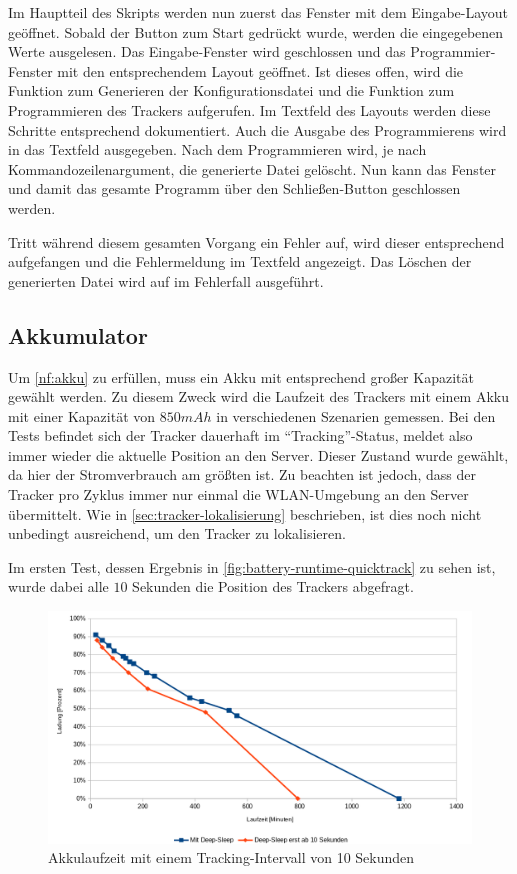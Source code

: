 Im Hauptteil des Skripts werden nun zuerst das Fenster mit dem Eingabe-Layout geöffnet.
Sobald der Button zum Start gedrückt wurde, werden die eingegebenen Werte ausgelesen.
Das Eingabe-Fenster wird geschlossen und das Programmier-Fenster mit den entsprechendem Layout geöffnet.
Ist dieses offen, wird die Funktion zum Generieren der Konfigurationsdatei und die Funktion zum Programmieren des Trackers aufgerufen.
Im Textfeld des Layouts werden diese Schritte entsprechend dokumentiert.
Auch die Ausgabe des Programmierens wird in das Textfeld ausgegeben.
Nach dem Programmieren wird, je nach Kommandozeilenargument, die generierte Datei gelöscht.
Nun kann das Fenster und damit das gesamte Programm über den Schließen-Button geschlossen werden.

Tritt während diesem gesamten Vorgang ein Fehler auf, wird dieser entsprechend aufgefangen und die Fehlermeldung im Textfeld angezeigt.
Das Löschen der generierten Datei wird auf im Fehlerfall ausgeführt.

\subsection{Akkumulator}

Um \ref*{nf:akku} zu erfüllen, muss ein \gls{Akku} mit entsprechend großer Kapazität gewählt werden.
Zu diesem Zweck wird die Laufzeit des Trackers mit einem \gls{Akku} mit einer Kapazität von $850
mAh$ in verschiedenen Szenarien gemessen. Bei den Tests befindet sich der Tracker dauerhaft im
\enquote{Tracking}-Status, meldet also immer wieder die aktuelle Position an den Server. Dieser
Zustand wurde gewählt, da hier der Stromverbrauch am größten ist. Zu beachten ist jedoch, dass der
Tracker pro Zyklus immer nur einmal die \gls{WLAN}-Umgebung an den Server übermittelt. Wie in
\autoref{sec:tracker-lokalisierung} beschrieben, ist dies noch nicht unbedingt ausreichend, um den
Tracker zu lokalisieren.

Im ersten Test, dessen Ergebnis in
\autoref{fig:battery-runtime-quicktrack} zu sehen ist, wurde dabei alle $10$ Sekunden die Position
des Trackers abgefragt.

\begin{figure}[htbp]
	\centering
	\includegraphics[width=.6\textwidth]{images/battery-runtime-quicktrack.png}
	\caption{Akkulaufzeit mit einem Tracking-Intervall von 10 Sekunden}
	\label{fig:battery-runtime-quicktrack}
\end{figure}

